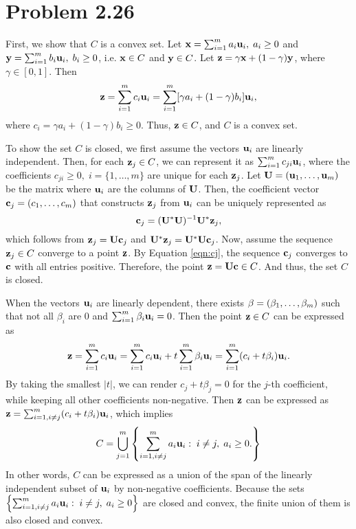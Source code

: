 \documentclass{scrartcl}
\begin{document}
\section*{Problem 2.26}
First, we show that $C$ is a convex set.
Let $\mathbf{x} = \sum_{i=1}^m a_i \mathbf{u}_i, \; a_i \ge 0$ and
$\mathbf{y} = \sum_{i=1}^m b_i \mathbf{u}_i, \; b_i \ge 0$, i.e. $\mathbf{x} \in C$
and $\mathbf{y} \in C$. Let $\mathbf{z} = \gamma \mathbf{x} + (1-\gamma) \mathbf{y}$, where
$\gamma \in [0,1]$. Then
\begin{equation}
	\mathbf{z} = \sum_{i=1}^m c_i \mathbf{u}_i
	       = \sum_{i=1}^m [\gamma a_i + (1-\gamma) b_i] \mathbf{u}_i,
\end{equation}
where $c_i = \gamma a_i + (1-\gamma) b_i \ge 0$. Thus, $\mathbf{z} \in C$, and
$C$ is a convex set.

To show the set $C$ is closed, we first assume the vectors $\mathbf{u}_i$ are
linearly independent. Then, for each $\mathbf{z}_j \in C$, we can represent it 
as $\sum_{i=1}^m c_{ji} \mathbf{u}_i$, where the coefficients
$c_{ji} \ge 0, \; i=\{1,\dotsc,m\}$ are unique for each $\mathbf{z}_j$.
Let $\mathbf{U} = (\mathbf{u}_1,\dotsc,\mathbf{u}_m)$ be the matrix where
$\mathbf{u}_i$ are the columns of $\mathbf{U}$. Then, the coefficient vector
$\mathbf{c}_j = (c_1,\dotsc,c_m)$ that constructs $\mathbf{z}_j$ from $\mathbf{u}_i$
can be uniquely represented as
\begin{equation}
	\mathbf{c}_j = (\mathbf{U}^*\mathbf{U})^{-1} \mathbf{U}^* \mathbf{z}_j,
	\label{eqn:cj}
\end{equation}
which follows from $\mathbf{z}_j=\mathbf{U}\mathbf{c}_j$ and
$\mathbf{U}^*\mathbf{z}_j=\mathbf{U}^*\mathbf{U}\mathbf{c}_j$.
Now, assume the sequence $\mathbf{z}_j \in C$ converge to a point $\mathbf{z}$.
By Equation \eqref{eqn:cj}, the sequence $\mathbf{c}_j$ converges to $\mathbf{c}$
with all entries positive. Therefore, the point $\mathbf{z} = \mathbf{U}\mathbf{c} \in C$.
And thus, the set $C$ is closed.

When the vectors $\mathbf{u}_i$ are linearly dependent, there exists
$\mathbf{\beta} = (\beta_1,\dotsc,\beta_m)$ such that not all $\beta_i$ are 0
and $\sum_{i=1}^m \beta_i \mathbf{u}_i = 0$. Then the point $\mathbf{z} \in C$
can be expressed as
\begin{equation}
	\mathbf{z} = \sum_{i=1}^m c_i \mathbf{u}_i
	       = \sum_{i=1}^m c_i \mathbf{u}_i + t \sum_{i=1}^m \beta_i \mathbf{u}_i
	       = \sum_{i=1}^m (c_i + t \beta_i) \mathbf{u}_i .
	\label{eqn:ttrick}
\end{equation}
By taking the smallest $|t|$, we can render $c_j + t \beta_j = 0$ for the
$j$-th coefficient, while keeping all other coefficients non-negative.
Then $\mathbf{z}$ can be expressed as
$\mathbf{z} = \sum_{i=1,i\ne j}^m (c_i + t \beta_i) \mathbf{u}_i$,
which implies
\begin{equation}
	C = \bigcup_{j=1}^{m}
	\left\lbrace 
		\sum_{i=1,i\ne j}^m a_i \mathbf{u}_i : \; i \ne j, \; a_i \ge 0 .
	\right\rbrace
\end{equation}
In other words, $C$ can be expressed as a union of the span of the linearly
independent subset of $\mathbf{u}_i$ by non-negative coefficients.
Because the sets
$\left\lbrace \sum_{i=1,i\ne j}^m a_i \mathbf{u}_i : \; i \ne j, \; a_i \ge 0 \right\rbrace$
are closed and convex, the finite union of them is also closed and convex.
\end{document}
